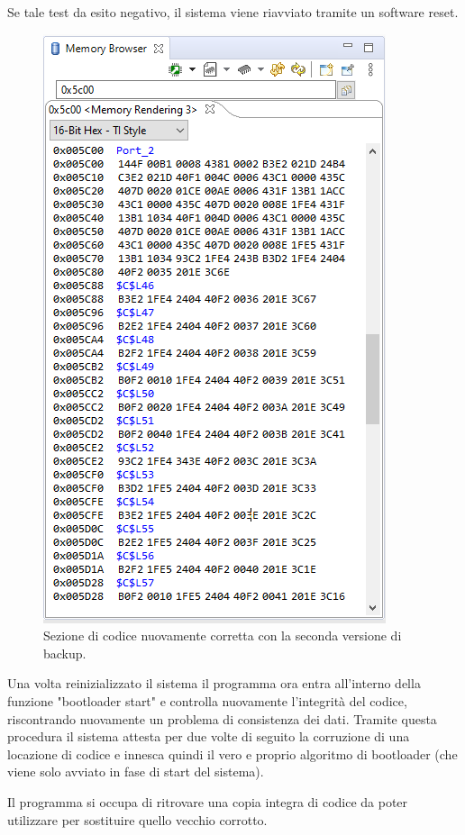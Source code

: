 \documentclass[LaM,binding=0.6cm]{../sapthesis}
\begin{document}
Se tale test da esito negativo, il sistema viene riavviato tramite un software reset.


\begin{figure}[htbp]
\centerline{\includegraphics[scale=0.55]{examples/BootloaderTestCorruzioni3.PNG}}
\caption{Sezione di codice nuovamente corretta con la seconda versione di backup.}
\label{fig}
\end{figure}
\newline

Una volta reinizializzato il sistema il programma ora entra all'interno della funzione "bootloader start" e controlla nuovamente l'integrità del codice, riscontrando nuovamente un problema di consistenza dei dati. Tramite questa procedura il sistema attesta per due volte di seguito la corruzione di una locazione di codice e innesca quindi il vero e proprio algoritmo di bootloader (che viene solo avviato in fase di start del sistema). 

Il programma si occupa di ritrovare una copia integra di codice da poter utilizzare per sostituire quello vecchio corrotto.
\end{document}
